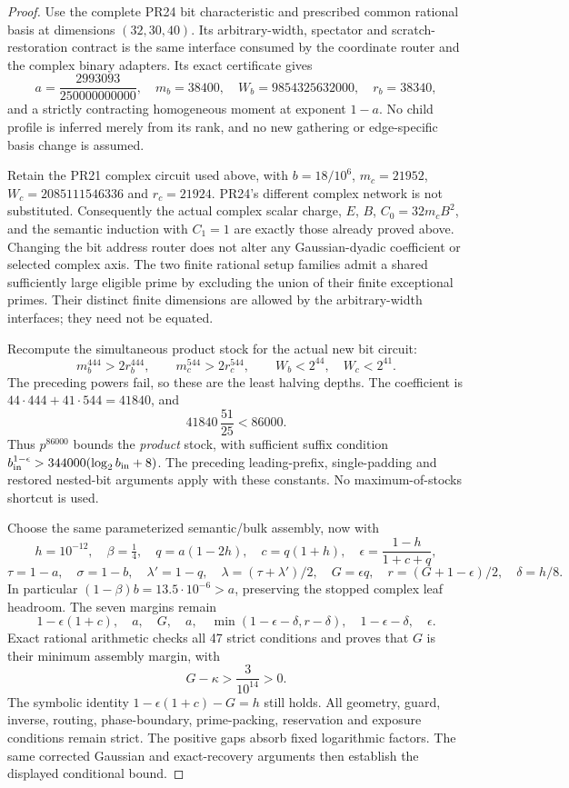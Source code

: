 \begin{proof}
Use the complete PR24 bit characteristic and prescribed common rational
basis at dimensions $(32,30,40)$. Its arbitrary-width, spectator and
scratch-restoration contract is the same interface consumed by the
coordinate router and the complex binary adapters. Its exact certificate
gives
\[
 a=\frac{2993093}{250000000000},\quad m_b=38400,\quad
 W_b=9854325632000,\quad r_b=38340,
\]
and a strictly contracting homogeneous moment at exponent $1-a$.
No child profile is inferred merely from its rank, and no new gathering
or edge-specific basis change is assumed.

Retain the PR21 complex circuit used above, with $b=18/10^6$,
$m_c=21952$, $W_c=2085111546336$ and $r_c=21924$.
PR24's different complex network is not substituted. Consequently the
actual complex scalar charge, $E$, $B$, $C_0=32m_cB^2$, and the semantic
induction with $C_1=1$ are exactly those already proved above. Changing
the bit address router does not alter any Gaussian-dyadic coefficient or
selected complex axis. The two finite rational setup families admit a
shared sufficiently large eligible prime by excluding the union of their
finite exceptional primes. Their distinct finite dimensions are allowed
by the arbitrary-width interfaces; they need not be equated.

Recompute the simultaneous product stock for the actual new bit circuit:
\[
 m_b^{444}>2r_b^{444},\qquad m_c^{544}>2r_c^{544},\qquad
 W_b<2^{44},\quad W_c<2^{41}.
\]
The preceding powers fail, so these are the least halving depths.
The coefficient is $44\cdot444+41\cdot544=41840$, and
\[
 41840\,\frac{51}{25}<86000.
\]
Thus $p^{86000}$ bounds the \emph{product} stock, with sufficient suffix
condition $b_{\rm in}^{1-\epsilon}>344000(\log_2 b_{\rm in}+8)$.
The preceding leading-prefix, single-padding and restored nested-bit
arguments apply with these constants. No maximum-of-stocks shortcut is used.

Choose the same parameterized semantic/bulk assembly, now with
\[
 h=10^{-12},\quad\beta=\tfrac14,\quad q=a(1-2h),\quad
 c=q(1+h),\quad\epsilon=\frac{1-h}{1+c+q},
\]
\[
 \tau=1-a,\quad\sigma=1-b,\quad
 \lambda'=1-q,\quad\lambda=(\tau+\lambda')/2,\quad
 G=\epsilon q,\quad r=(G+1-\epsilon)/2,\quad\delta=h/8.
\]
In particular $(1-\beta)b=13.5\cdot10^{-6}>a$, preserving the
stopped complex leaf headroom. The seven margins remain
\[
 1-\epsilon(1+c),\quad a,\quad G,\quad a,\quad
 \min(1-\epsilon-\delta,r-\delta),\quad
 1-\epsilon-\delta,\quad\epsilon.
\]
Exact rational arithmetic checks all 47 strict conditions and proves
that $G$ is their minimum assembly margin, with
\[
 G-\kappa>\frac{3}{10^{14}}>0.
\]
The symbolic identity $1-\epsilon(1+c)-G=h$ still holds. All geometry,
guard, inverse, routing, phase-boundary, prime-packing, reservation and
exposure conditions remain strict. The positive gaps absorb fixed
logarithmic factors. The same corrected Gaussian and exact-recovery
arguments then establish the displayed conditional bound.
\end{proof}

